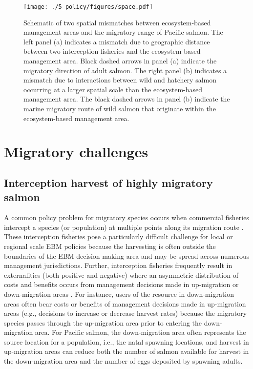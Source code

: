\begin{figure}[htbp]
  \centering \texttt{[image: ./5\_policy/figures/space.pdf]}
  \caption[Schematic of two spatial mismatches between ecosystem-based
           management areas and the migratory range of Pacific
           salmon]{Schematic of two spatial mismatches between ecosystem-based
           management areas and the migratory range of Pacific salmon. The left
           panel (a) indicates a mismatch due to geographic distance between two
           interception fisheries and the ecosystem-based management area. Black
           dashed arrows in panel (a) indicate the migratory direction of adult
           salmon. The right panel (b) indicates a mismatch due to interactions
           between wild and hatchery salmon occurring at a larger spatial scale
           than the ecosystem-based management area. The black dashed arrows in
           panel (b) indicate the marine migratory route of wild salmon that
           originate within the ecosystem-based management area.}
  \label{fig:ebm:1}
\end{figure}



\section{Migratory challenges}

\subsection{Interception harvest of highly migratory salmon}

A common policy problem for migratory species occurs when commercial fisheries
intercept a species (or population) at multiple points along its migration route
\citep{Lascelles2014}. These interception fisheries pose a particularly
difficult challenge for local or regional scale EBM policies because the
harvesting is often outside the boundaries of the EBM decision-making area and
may be spread across numerous management jurisdictions. Further, interception
fisheries frequently result in externalities (both positive and negative) where
an asymmetric distribution of costs and benefits occurs from management
decisions made in up-migration or down-migration areas \citep{Scherer1990}. For
instance, users of the resource in down-migration areas often bear costs or
benefits of management decisions made in up-migration areas (e.g., decisions to
increase or decrease harvest rates) because the migratory species passes through
the up-migration area prior to entering the down-migration area. For Pacific
salmon, the down-migration area often represents the source location for a
population, i.e., the natal spawning locations, and harvest in up-migration
areas can reduce both the number of salmon available for harvest in the
down-migration area and the number of eggs deposited by spawning adults.

